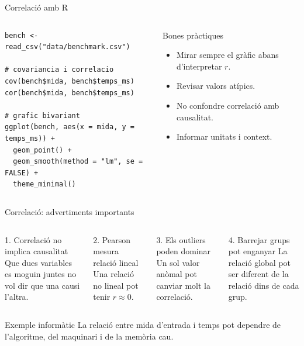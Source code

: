 \documentclass[10pt,aspectratio=169]{beamer}
\begin{document}
\begin{frame}[fragile]{Correlació amb R}
\begin{columns}[T]
\begin{lstlisting}
bench <- read_csv("data/benchmark.csv")

# covariancia i correlacio
cov(bench$mida, bench$temps_ms)
cor(bench$mida, bench$temps_ms)

# grafic bivariant
ggplot(bench, aes(x = mida, y = temps_ms)) +
  geom_point() +
  geom_smooth(method = "lm", se = FALSE) +
  theme_minimal()
\end{lstlisting}
\begin{block}{Bones pràctiques}
\begin{itemize}
  \item Mirar sempre el gràfic abans d'interpretar $r$.
  \item Revisar valors atípics.
  \item No confondre correlació amb causalitat.
  \item Informar unitats i context.
\end{itemize}
\end{block}
\end{columns}
\end{frame}

\begin{frame}{Correlació: advertiments importants}
\begin{columns}[T]
\begin{alertblock}{1. Correlació no implica causalitat}
Que dues variables es moguin juntes no vol dir que una causi l'altra.
\end{alertblock}
\begin{alertblock}{2. Pearson mesura relació lineal}
Una relació no lineal pot tenir $r\approx 0$.
\end{alertblock}
\begin{alertblock}{3. Els outliers poden dominar}
Un sol valor anòmal pot canviar molt la correlació.
\end{alertblock}
\begin{alertblock}{4. Barrejar grups pot enganyar}
La relació global pot ser diferent de la relació dins de cada grup.
\end{alertblock}
\end{columns}
\vspace{0.2cm}
\begin{exampleblock}{Exemple informàtic}
La relació entre mida d'entrada i temps pot dependre de l'algoritme, del maquinari i de la memòria cau.
\end{exampleblock}
\end{frame}
\end{document}
